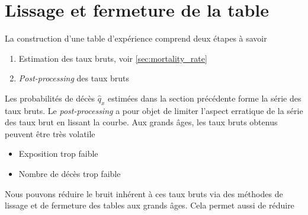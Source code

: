 \section{Lissage et fermeture de la table}
La construction d'une table d'expérience comprend deux étapes à savoir 
\begin{enumerate}
  \item Estimation des taux bruts, voir \cref{sec:mortality_rate}
  \item \textit{Post-processing} des taux bruts
\end{enumerate}
Les probabilités de décès $\widehat{q}_x$ estimées dans la section précédente forme la série des taux bruts. Le \textit{post-processing} a pour objet de limiter l'aspect erratique de la série des taux brut en lissant la courbe. Aux grands âges, les taux bruts obtenus peuvent être très volatile 
\begin{itemize}
  \item Exposition trop faible 
  \item Nombre de décès trop faible 
\end{itemize}
Nous pouvons réduire le bruit inhérent à ces taux bruts via des méthodes de lissage et de fermeture des tables aux grands âges. Cela permet aussi de réduire 
